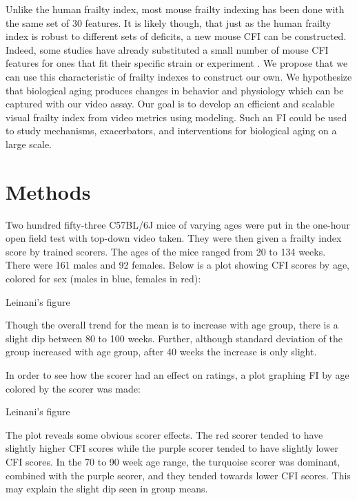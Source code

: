 \documentclass[11pt]{amsart}
\begin{document}
Unlike the human frailty index, most mouse frailty indexing has been done with the same set of 30 features. It is likely though, that just as the human frailty index is robust to different sets of deficits, a new mouse CFI can be constructed. Indeed, some studies have already substituted a small number of mouse CFI features for ones that fit their specific strain or experiment \citep{kane2017implementation}. We propose that we can use this characteristic of frailty indexes to construct our own. We hypothesize that biological aging produces changes in behavior and physiology which can be captured with our video assay. Our goal is to develop an efficient and scalable visual frailty index from video metrics using modeling. Such an FI could be used to study mechanisms, exacerbators, and interventions for biological aging on a large scale. 

\section{Methods}
Two hundred fifty-three C57BL/6J mice of varying ages were put in the one-hour open field test with top-down video taken. They were then given a frailty index score by trained scorers. The ages of the mice ranged from 20 to 134 weeks. There were 161 males and 92 females. Below is a plot showing CFI scores by age, colored for sex (males in blue, females in red):

\begin{center}

Leinani's figure

\end{center} 




Though the overall trend for the mean is to increase with age group, there is a slight dip between 80 to 100 weeks. Further, although standard deviation of the group increased with age group, after 40 weeks the increase is only slight.

In order to see how the scorer had an effect on ratings, a plot graphing FI by age colored by the scorer was made:

\begin{center}

Leinani's figure

\end{center} 


The plot reveals some obvious scorer effects. The red scorer tended to have slightly higher CFI scores while the purple scorer tended to have slightly lower CFI scores. In the 70 to 90 week age range, the turquoise scorer was dominant, combined with the purple scorer, and they tended towards lower CFI scores. This may explain the slight dip seen in group means.
\end{document}
